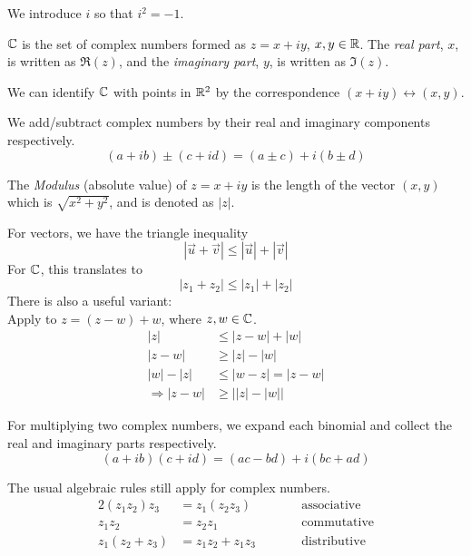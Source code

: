 \documentclass{article}
\begin{document}
	\noindent We introduce $i$ so that $i^2 = -1$.

	\begin{defi}
		$\mathbb{C}$ is the set of complex numbers formed as $z=x+iy$, $x,y \in \mathbb{R}$. The \textit{real part}, $x$, is written as $\Re(z)$, and the \textit{imaginary part}, $y$, is written as $\Im(z)$.
	\end{defi}

	\begin{note}
		We can identify $\mathbb{C}$ with points in $\mathbb{R}^2$ by the correspondence $(x+iy) \leftrightarrow (x,y)$.
	\end{note}

	
	\begin{defi}
		We add/subtract complex numbers by their real and imaginary components respectively.
		\[
			(a+ib) \pm (c+id) = (a\pm c) + i(b \pm d)
		\]
	\end{defi}

	\begin{defi}
		The \textit{Modulus} (absolute value) of $z=x+iy$ is the length of the vector $(x,y)$ which is $\sqrt{x^2+y^2}$, and is denoted as $|z|$.
	\end{defi}

	\begin{defi}

		For vectors, we have the triangle inequality
		\[
			|\vec{u} + \vec{v}| \leq |\vec{u}| + |\vec{v}|
		\]
		For $\mathbb{C}$, this translates to
		\[
			|z_1 + z_2| \leq |z_1| + |z_2|
		\]
		There is also a useful variant: \\
	
			Apply to $z=(z-w) + w$, where $z,w \in \mathbb{C}$.
			\begin{align*}
				|z| &\leq |z-w| + |w| \\
				|z-w| &\geq |z| - |w| \\
				|w| - |z| &\leq |w-z| = |z-w| \\
				\Rightarrow |z-w| &\geq \big| |z| - |w| \big| 
		\end{align*}
	\end{defi}

	\begin{defi}[Multiplication]
		For multiplying two complex numbers, we expand each binomial and collect the real and imaginary parts respectively.
		\[
			(a+ib)(c+id) = (ac-bd) + i(bc + ad)
		\]
	\end{defi}

	The usual algebraic rules still apply for complex numbers.
	\begin{alignat*}{2}
		(z_1 z_2) z_3 &= z_1(z_2 z_3) \qquad  &&\text{associative} \\
		z_1 z_2 &= z_2 z_1 \qquad &&\text{commutative} \\
		z_1(z_2 + z_3) &= z_1 z_2 + z_1 z_3 \qquad &&\text{distributive}
	\end{alignat*}
\end{document}
